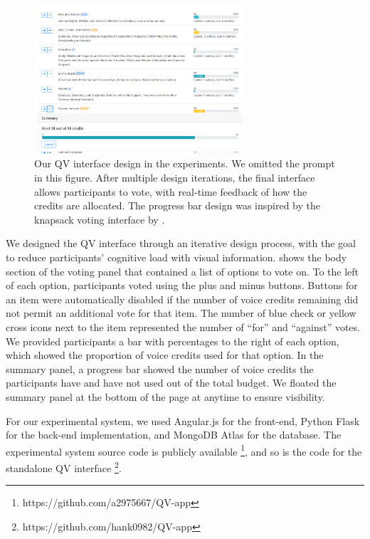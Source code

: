 \begin{figure}[htpb]
    \centering
    \includegraphics[width=0.7\textwidth, keepaspectratio=true]{content/image/qv-donation.png}
    \caption{
        Our QV interface design in the experiments. 
        We omitted the prompt in this figure.
        After multiple design iterations, 
        the final interface allows participants to vote, with real-time feedback of how the credits are allocated. 
        The progress bar design was inspired by the knapsack voting interface by \cite{goel2015knapsack}.
    }
    \label{fig:qv_donation}
\end{figure}

We designed the QV interface through an iterative design process, with the goal to reduce participants' cognitive load with visual information.  shows the body section of the voting panel that contained a list of options to vote on. To the left of each option, participants voted using the plus and minus buttons. Buttons for an item were automatically disabled if the number of voice credits remaining did not permit an additional vote for that item. The number of blue check or yellow cross icons next to the item represented the number of ``for'' and ``against'' votes. We provided participants a bar with percentages to the right of each option, which showed the proportion of voice credits used for that option.  In the summary panel, a progress bar showed the number of voice credits the participants have and have not used out of the total budget. We floated the summary panel at the bottom of the page at anytime to ensure visibility.

For our experimental system, we used Angular.js for the front-end, Python Flask for the back-end implementation, and MongoDB Atlas for the database. The experimental system source code is publicly available \footnote{https://github.com/a2975667/QV-app}, and so is the code for the standalone QV interface \footnote{https://github.com/hank0982/QV-app}. 


